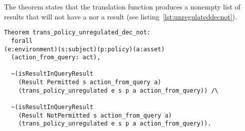 The theorem  states that the translation function  produces a nonempty list of results that will not have a  nor a  result (see listing~\ref{lst:unregulateddecnot}).


\begin{lstlisting}
Theorem trans_policy_unregulated_dec_not:
  forall 
(e:environment)(s:subject)(p:policy)(a:asset)
  (action_from_query: act),
 
  ~(isResultInQueryResult 
    (Result Permitted s action_from_query a)
    (trans_policy_unregulated e s p a action_from_query)) /\
  
  ~(isResultInQueryResult 
    (Result NotPermitted s action_from_query a)
    (trans_policy_unregulated e s p a action_from_query)).
\end{lstlisting}















